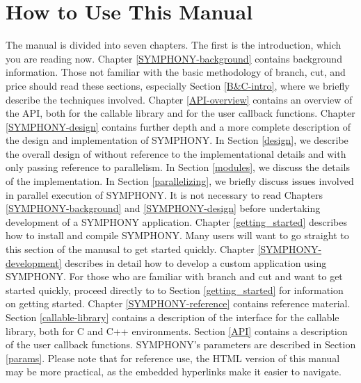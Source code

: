 \section{How to Use This Manual}

The manual is divided into seven chapters. The first is the introduction,
which you are reading now. Chapter \ref{SYMPHONY-background} contains
background information. Those not familiar with the basic methodology of
branch, cut, and price should read these sections, especially Section
\ref{B&C-intro}, where we briefly describe the techniques involved. Chapter
\ref{API-overview} contains an overview of the API, both for the callable
library and for the user callback functions. Chapter \ref{SYMPHONY-design}
contains further depth and a more complete description of the design and
implementation of SYMPHONY. In Section \ref{design}, we describe the overall
design of without reference to the implementational details and with only
passing reference to parallelism. In Section \ref{modules}, we discuss the
details of the implementation. In Section \ref{parallelizing}, we briefly
discuss issues involved in parallel execution of SYMPHONY. It is not necessary
to read Chapters \ref{SYMPHONY-background} and \ref{SYMPHONY-design} before
undertaking development of a SYMPHONY application. Chapter
\ref{getting_started} describes how to install and compile SYMPHONY. Many
users will want to go straight to this section of the manusal to get started
quickly. Chapter \ref{SYMPHONY-development} describes in detail how to develop
a custom application using SYMPHONY. For those who are familiar with branch
and cut and want to get started quickly, proceed directly to to Section
\ref{getting_started} for information on getting started. Chapter
\ref{SYMPHONY-reference} contains reference material. Section
\ref{callable-library} contains a description of the interface for the
callable library, both for C and C++ environments. Section \ref{API} contains
a description of the user callback functions. SYMPHONY's parameters are
described in Section \ref{params}. Please note that for reference use, the
HTML version of this manual may be more practical, as the embedded hyperlinks
make it easier to navigate.
